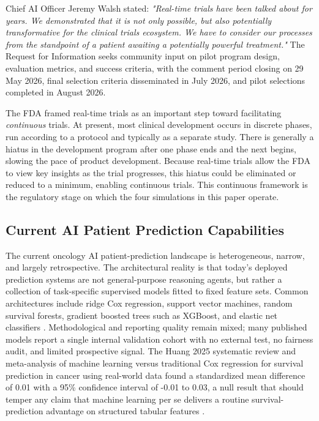 Chief AI Officer Jeremy Walsh stated: \emph{"Real-time trials have been
talked about for years. We demonstrated that it is not only possible,
but also potentially transformative for the clinical trials ecosystem.
We have to consider our processes from the standpoint of a patient
awaiting a potentially powerful treatment."} The Request for
Information seeks community input on pilot program design, evaluation
metrics, and success criteria, with the comment period closing on 29
May 2026, final selection criteria disseminated in July 2026, and
pilot selections completed in August 2026.

The FDA framed real-time trials as an important step toward facilitating
\emph{continuous} trials. At present, most clinical development occurs
in discrete phases, run according to a protocol and typically as a
separate study. There is generally a hiatus in the development program
after one phase ends and the next begins, slowing the pace of product
development. Because real-time trials allow the FDA to view key
insights as the trial progresses, this hiatus could be eliminated or
reduced to a minimum, enabling continuous trials. This continuous
framework is the regulatory stage on which the four simulations in
this paper operate.

\subsection{Current AI Patient Prediction Capabilities}
\label{sec:intro-ai-baseline}

The current oncology AI patient-prediction landscape is heterogeneous,
narrow, and largely retrospective. The architectural reality is that
today's deployed prediction systems are not general-purpose reasoning
agents, but rather a collection of task-specific supervised models
fitted to fixed feature sets. Common architectures include ridge Cox
regression, support vector machines, random survival forests, gradient
boosted trees such as XGBoost, and elastic net classifiers
\cite{Smiley2025OncologyMLReportingQuality}. Methodological and
reporting quality remain mixed; many published models report a single
internal validation cohort with no external test, no fairness audit,
and limited prospective signal. The Huang 2025 systematic review and
meta-analysis of machine learning versus traditional Cox regression for
survival prediction in cancer using real-world data found a
standardized mean difference of 0.01 with a 95\% confidence interval
of -0.01 to 0.03, a null result that should temper any claim that
machine learning per se delivers a routine survival-prediction
advantage on structured tabular features
\cite{Huang2025CancerSurvivalMetaAnalysis}.

